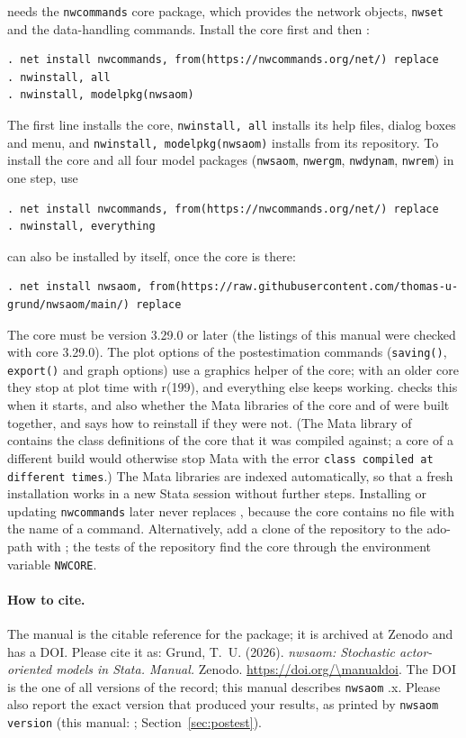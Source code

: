 \nwsaom{} needs the \texttt{nwcommands} core package, which provides the network objects, \texttt{nwset} and the data-handling commands. Install the core first and then \nwsaom{}:
\begin{lstlisting}
. net install nwcommands, from(https://nwcommands.org/net/) replace
. nwinstall, all
. nwinstall, modelpkg(nwsaom)
\end{lstlisting}
The first line installs the core, \texttt{nwinstall, all} installs its help files, dialog boxes and menu, and \texttt{nwinstall, modelpkg(nwsaom)} installs \nwsaom{} from its repository. To install the core and all four model packages (\texttt{nwsaom}, \texttt{nwergm}, \texttt{nwdynam}, \texttt{nwrem}) in one step, use
\begin{lstlisting}
. net install nwcommands, from(https://nwcommands.org/net/) replace
. nwinstall, everything
\end{lstlisting}
\nwsaom{} can also be installed by itself, once the core is there:
\begin{lstlisting}
. net install nwsaom, from(https://raw.githubusercontent.com/thomas-u-grund/nwsaom/main/) replace
\end{lstlisting}
The core must be version 3.29.0 or later (the listings of this manual were checked with core 3.29.0). The plot options of the postestimation commands (\texttt{saving()}, \texttt{export()} and graph options) use a graphics helper of the core; with an older core they stop at plot time with r(199), and everything else keeps working. \nwsaom{} checks this when it starts, and also whether the Mata libraries of the core and of \nwsaom{} were built together, and says how to reinstall if they were not. (The Mata library of \nwsaom{} contains the class definitions of the core that it was compiled against; a core of a different build would otherwise stop Mata with the error \texttt{class compiled at different times}.) The Mata libraries are indexed automatically, so that a fresh installation works in a new Stata session without further steps. Installing or updating \texttt{nwcommands} later never replaces \nwsaom{}, because the core contains no file with the name of a \nwsaom{} command. Alternatively, add a clone of the \nwsaom{} repository to the ado-path with ; the tests of the repository find the core through the environment variable \texttt{NWCORE}.

\paragraph{How to cite.} The manual is the citable reference for the package; it is archived at Zenodo and has a DOI. Please cite it as: Grund, T.~U. (2026). \emph{nwsaom: Stochastic actor-oriented models in Stata. Manual.} Zenodo. \url{https://doi.org/\manualdoi}. The DOI is the one of all versions of the record; this manual describes \texttt{nwsaom} \manualseries.x. Please also report the exact version that produced your results, as printed by \texttt{nwsaom version} (this manual: \pkgversion; Section~\ref{sec:postest}).


